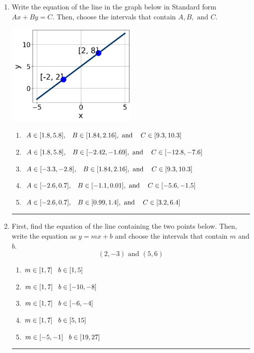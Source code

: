 \documentclass[14pt]{extbook}
\newcommand{\litem}[1]{\item#1\hspace*{-1cm}\rule{\textwidth}{0.4pt}}
\begin{document}
\begin{enumerate}
{\begin{enumerate}[label=\Alph*.]
\end{enumerate} }
\litem{
Write the equation of the line in the graph below in Standard form $Ax+By=C$. Then, choose the intervals that contain $A, B, \text{ and } C$.
\begin{center}
    \includegraphics[width=0.5\textwidth]{../Figures/linearGraphToStandardC.png}
\end{center}
\begin{enumerate}[label=\Alph*.]
\item \( A \in [1.8, 5.8], \hspace{3mm} B \in [1.84, 2.16], \text{ and } \hspace{3mm} C \in [9.3, 10.3] \)
\item \( A \in [1.8, 5.8], \hspace{3mm} B \in [-2.42, -1.69], \text{ and } \hspace{3mm} C \in [-12.8, -7.6] \)
\item \( A \in [-3.3, -2.8], \hspace{3mm} B \in [1.84, 2.16], \text{ and } \hspace{3mm} C \in [9.3, 10.3] \)
\item \( A \in [-2.6, 0.7], \hspace{3mm} B \in [-1.1, 0.01], \text{ and } \hspace{3mm} C \in [-5.6, -1.5] \)
\item \( A \in [-2.6, 0.7], \hspace{3mm} B \in [0.99, 1.4], \text{ and } \hspace{3mm} C \in [3.2, 6.4] \)

\end{enumerate} }
\litem{
First, find the equation of the line containing the two points below. Then, write the equation as $ y=mx+b $ and choose the intervals that contain $m$ and $b$.\[ (2, -3) \text{ and } (5, 6) \]\begin{enumerate}[label=\Alph*.]
\item \( m \in [1, 7] \hspace*{3mm} b \in [1, 5] \)
\item \( m \in [1, 7] \hspace*{3mm} b \in [-10, -8] \)
\item \( m \in [1, 7] \hspace*{3mm} b \in [-6, -4] \)
\item \( m \in [1, 7] \hspace*{3mm} b \in [5, 15] \)
\item \( m \in [-5, -1] \hspace*{3mm} b \in [19, 27] \)


\end{enumerate}}
\end{enumerate}
\end{document}
